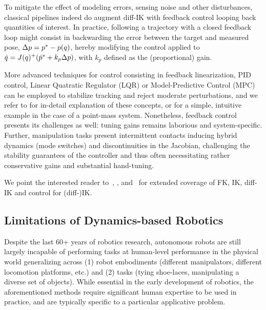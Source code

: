 To mitigate the effect of modeling errors, sensing noise and other disturbances, classical pipelines indeed do augment diff-IK with feedback control looping back quantities of interest.
In practice, following a trajectory with a closed feedback loop might consist in backwarding the error between the target and measured pose, \( \Delta p = p^* - p(q) \), hereby modifying the control applied to \( \dot q = J(q)^+ (\dot {p}^* + k_p \Delta p ) \), with \( k_p \) defined as the (proportional) gain.

More advanced techniques for control consisting in feedback linearization, PID control, Linear Quatratic Regulator (LQR) or Model-Predictive Control (MPC) can be employed to stabilize tracking and reject moderate perturbations, and we refer to \citet[Chapter~8]{sicilianoSpringerHandbookRobotics2016} for in-detail explanation of these concepts, or \citep[Chapter~8]{tedrakeRoboticManipulationPerception} for a simple, intuitive example in the case of a point-mass system.
Nonetheless, feedback control presents its challenges as well: tuning gains remains laborious and system-specific. 
Further, manipulation tasks present intermittent contacts inducing hybrid dynamics (mode switches) and discontinuities in the Jacobian, challenging the stability guarantees of the controller and thus often necessitating rather conservative gains and substantial hand-tuning.

We point the interested reader to~\citet[Chapter~2,7,8]{sicilianoSpringerHandbookRobotics2016}, \citet[Chapter~6,11]{lynchModernRoboticsMechanics2017}, and~\citet[Chapter~3,8]{tedrakeRoboticManipulationPerception} for extended coverage of FK, IK, diff-IK and control for (diff-)IK.

\subsection{Limitations of Dynamics-based Robotics}
Despite the last 60+ years of robotics research, autonomous robots are still largely incapable of performing tasks at human-level performance in the physical world generalizing across (1) robot embodiments (different manipulators, different locomotion platforms, etc.) and (2) tasks (tying shoe-laces, manipulating a diverse set of objects).
While essential in the early development of robotics, the aforementioned methods require significant human expertise to be used in practice, and are typically specific to a particular applicative problem.


